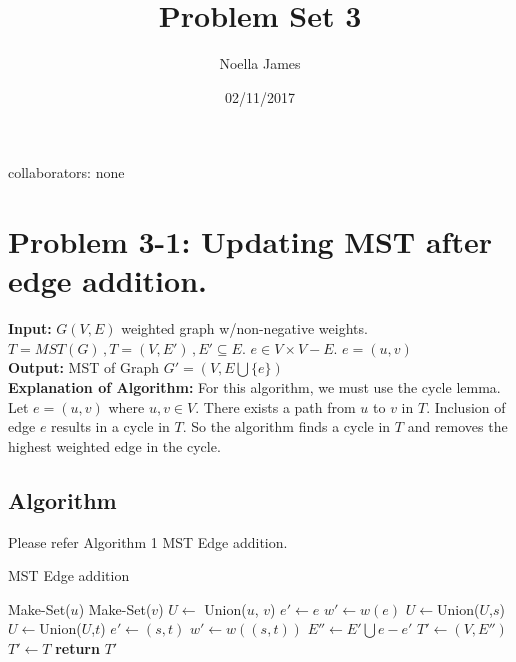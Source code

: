 \documentclass{article}
\theoremstyle{definition}
\theoremstyle{remark}
\theoremstyle{plain}
\begin{document}
\title{Problem Set 3}
\date{02/11/2017}
\author{Noella James}
\maketitle
collaborators: none\\

\section{Problem 3-1: Updating MST after edge addition.}
\textbf{Input:} $G(V,E)$ weighted graph w/non-negative weights. $T = MST(G) \,, T = (V, E') \,,E' \subseteq E$. $e \in V \times V - E.$ $e = (u,v)$\\
\textbf{Output:} MST of Graph $G' = (V,E  \bigcup \{e\})$\\
\textbf{Explanation of Algorithm:} For this algorithm, we must use the cycle lemma. Let $e = (u,v)$ where $u,v \in V$. There exists a path from $u$ to $v$ in $T$. Inclusion of edge $e$ results in a cycle in $T$. So the algorithm finds a cycle in $T$ and removes the highest weighted edge in the cycle.\\
\subsection{Algorithm}
 Please refer Algorithm 1 MST Edge addition.\\
\begin{algorithm}
\caption{MST Edge addition}\label{Updating MST after edge addition}
\begin{algorithmic}[1]
	\State Make-Set($u$)
	\State Make-Set($v$)
	\State $U \gets $ Union($u$, $v$) 
	\State $e' \gets e$
	\State $w' \gets w(e)$
			\State $U \gets $Union($U$,$s$) 
		\Else
			\State $U \gets $Union($U$,$t$) 
		\EndIf
		 
			\State $e' \gets (s,t)$
			\State $ w' \gets w((s,t))$
		\EndIf
	\EndFor
	 
		\State $E'' \gets E' \bigcup {e} - {e'}$
		\State $T' \gets (V,E'')$
	\Else
		\State $T' \gets T$	
	\EndIf
	\State \textbf{return} $T'$
\EndProcedure
\end{algorithmic}
\end{algorithm}
\end{document}
